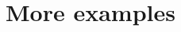 \documentclass[9pt,table,xcolor=dvipsnames]{beamer}
\begin{document}
\section{More examples}


\end{document}
